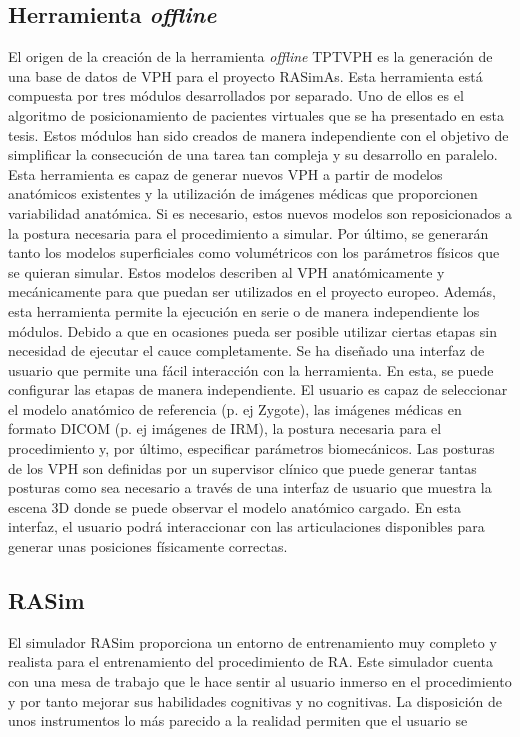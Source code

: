 \subsection{Herramienta \emph{offline}}
\label{conclu:herramienta}
El origen de la creación de la herramienta \emph{offline} \ac{TPTVPH} es la generación de una base de datos de \ac{VPH} para el proyecto \ac{RASimAs}. Esta herramienta está compuesta por tres módulos desarrollados por separado. Uno de ellos es el algoritmo de posicionamiento de pacientes virtuales que se ha presentado en esta tesis. Estos módulos han sido creados de manera independiente con el objetivo de simplificar la consecución de una tarea tan compleja y su desarrollo en paralelo. Esta herramienta es capaz de generar nuevos \ac{VPH} a partir de modelos anatómicos existentes y la utilización de imágenes médicas que proporcionen variabilidad anatómica. Si es necesario, estos nuevos modelos son reposicionados a la postura necesaria para el procedimiento a simular. Por último, se generarán tanto los modelos superficiales como volumétricos con los parámetros físicos que se quieran simular. Estos modelos describen al \ac{VPH} anatómicamente y mecánicamente para que puedan ser utilizados en el proyecto europeo. Además, esta herramienta permite la ejecución en serie o de manera independiente los módulos. Debido a que en ocasiones pueda ser posible utilizar ciertas etapas sin necesidad de ejecutar el cauce completamente.
Se ha diseñado una interfaz de usuario que permite una fácil interacción con la herramienta. En esta, se puede configurar las etapas de manera independiente. El usuario es capaz de seleccionar el modelo anatómico de referencia (p. ej Zygote), las imágenes médicas en formato \ac{DICOM} (p. ej imágenes de \ac{IRM}), la postura necesaria para el procedimiento y, por último, especificar parámetros biomecánicos. 
Las posturas de los \ac{VPH} son definidas por un supervisor clínico que puede generar tantas posturas como sea necesario a través de una interfaz de usuario que muestra la escena 3D donde se puede observar el modelo anatómico cargado. En esta interfaz, el usuario podrá interaccionar con las articulaciones disponibles para generar unas posiciones físicamente correctas.

\subsection{RASim}
\label{conclu:rasim}
El simulador \ac{RASim} proporciona un entorno de entrenamiento muy completo y realista para el entrenamiento del procedimiento de \ac{RA}.  Este simulador cuenta con una mesa de trabajo que le hace sentir al usuario inmerso en el procedimiento y por tanto mejorar sus habilidades cognitivas y no cognitivas. La disposición de unos instrumentos lo más parecido a la realidad permiten que el usuario se 

